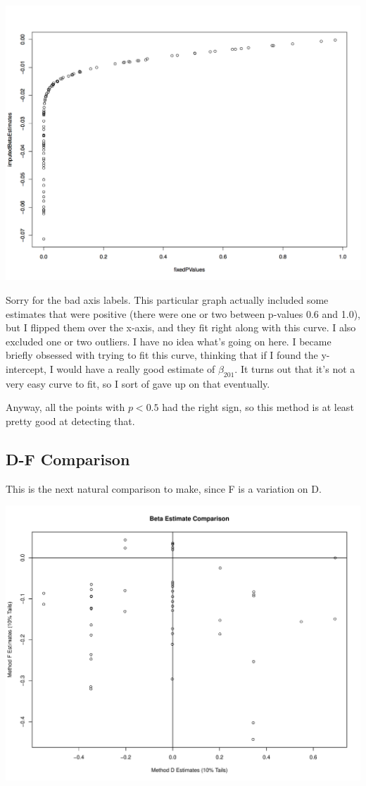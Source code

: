 \documentclass[11pt]{article} %
\begin{document}
\includegraphics[scale=0.5]{Beta Estimates vs p-Value.png}

Sorry for the bad axis labels. This particular graph actually included some estimates that were positive (there were one or two between p-values 0.6 and 1.0), but I flipped them over the x-axis, and they fit right along with this curve. I also excluded one or two outliers. I have no idea what's going on here. I became briefly obsessed with trying to fit this curve, thinking that if I found the y-intercept, I would have a really good estimate of $\beta_{201}$. It turns out that it's not a very easy curve to fit, so I sort of gave up on that eventually.

Anyway, all the points with $p<0.5$ had the right sign, so this method is at least pretty good at detecting that.

\subsection{D-F Comparison}
This is the next natural comparison to make, since F is a variation on D.

\includegraphics[scale=0.5]{DF Comparison (10Percent).pdf}
\end{document}
